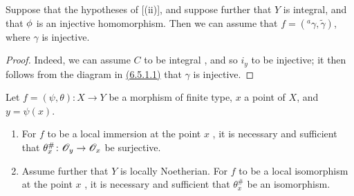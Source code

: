 \begin{cor}[6.5.3]
\label{1.6.5.3}
Suppose that the hypotheses of [(ii)], and suppose further that $Y$ is integral, and that $\phi$ is an injective homomorphism.
Then we can assume that $f=({}^a\gamma,\widetilde{\gamma})$, where $\gamma$ is injective.
\end{cor}

\begin{proof}
\label{proof-1.6.5.3}
Indeed, we can assume $C$ to be integral , and so $i_y$ to be injective;
it then follows from the diagram in \hyperref[1.6.5.1]{(6.5.1.1)} that $\gamma$ is injective.
\end{proof}

\begin{prop}[6.5.4]
\label{1.6.5.4}
Let $f=(\psi,\theta)\colon X\to Y$ be a morphism of finite type, $x$ a point of $X$, and $y=\psi(x)$.
\begin{enumerate}[label=\rm(\roman*)]
    \item For $f$ to be a local immersion at the point $x$ , it is necessary and sufficient that $\theta_x^\#\colon\mathscr{O}_y\to\mathscr{O}_x$ be surjective.
    \item Assume further that $Y$ is locally Noetherian.
        For $f$ to be a local isomorphism at the point $x$ , it is necessary and sufficient that $\theta_x^\#$ be an isomorphism.
\end{enumerate}
\end{prop}

